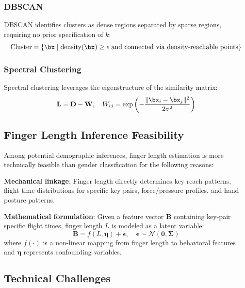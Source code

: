 \documentclass[11pt,twoside]{amsart}
\theoremstyle{plain}
\theoremstyle{definition}
\theoremstyle{remark}
\newcommand{\bB}{\mathbf{B}}
\newcommand{\bepsilon}{\boldsymbol{\epsilon}}
\newcommand{\bSigma}{\boldsymbol{\Sigma}}
\newcommand{\boldeta}{\boldsymbol{\eta}}
\newcommand{\calN}{\mathcal{N}}
\begin{document}
\subsubsection{DBSCAN}

DBSCAN identifies clusters as dense regions separated by sparse regions, requiring no prior specification of $k$:
\begin{equation}
\text{Cluster} = \{\bx \mid \text{density}(\bx) \geq \epsilon \text{ and connected via density-reachable points}\}
\end{equation}

\subsubsection{Spectral Clustering}

Spectral clustering leverages the eigenstructure of the similarity matrix:
\begin{equation}
\mathbf{L} = \mathbf{D} - \mathbf{W}, \quad W_{ij} = \exp\left(-\frac{\|\bx_i - \bx_j\|^2}{2\sigma^2}\right)
\end{equation}

\subsection{Finger Length Inference Feasibility}

Among potential demographic inferences, finger length estimation is more technically feasible than gender classification for the following reasons:

\textbf{Mechanical linkage}: Finger length directly determines key reach patterns, flight time distributions for specific key pairs, force/pressure profiles, and hand posture patterns.

\textbf{Mathematical formulation}: Given a feature vector $\bB$ containing key-pair specific flight times, finger length $L$ is modeled as a latent variable:
\begin{equation}
\bB = f(L, \boldeta) + \bepsilon, \quad \bepsilon \sim \calN(\mathbf{0}, \bSigma)
\end{equation}
where $f(\cdot)$ is a non-linear mapping from finger length to behavioral features and $\boldeta$ represents confounding variables.

\subsection{Technical Challenges}
\end{document}

